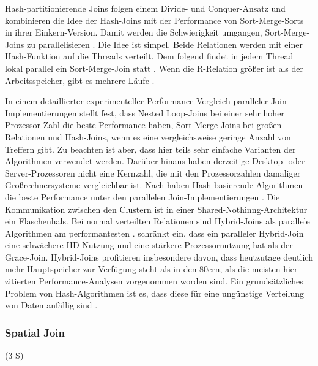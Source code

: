 \documentclass[a4paper,12pt,twoside]{article}
\begin{document}
Hash-partitionierende Joins folgen einem Divide- und Conquer-Ansatz und kombinieren die Idee der Hash-Joins mit der Performance von Sort-Merge-Sorts in ihrer Einkern-Version. Damit werden die Schwierigkeit umgangen, Sort-Merge-Joins zu parallelisieren {\autocite[S. 75ff]{Mishra199}}. Die Idee ist simpel. Beide Relationen werden mit einer Hash-Funktion auf die Threads verteilt. Dem folgend findet in jedem Thread lokal parallel ein Sort-Merge-Join statt {\autocite{Richardson1987}}. Wenn die R-Relation größer ist als der Arbeitsspeicher, gibt es mehrere Läufe {\autocite{Lu1990}}.

In einem detaillierter experimenteller Performance-Vergleich paralleler Join-Implementierungen stellt {\textcite{Valduriez1984}} fest, dass Nested Loop-Joins bei einer sehr hoher Prozessor-Zahl die beste Performance haben, Sort-Merge-Joins bei großen Relationen und Hash-Joins, wenn es eine vergleichsweise geringe Anzahl von Treffern gibt. Zu beachten ist aber, dass hier teils sehr einfache Varianten der Algorithmen verwendet werden. Darüber hinaus haben derzeitige Desktop- oder Server-Prozessoren nicht eine Kernzahl, die mit den Prozessorzahlen damaliger Großrechnersysteme vergleichbar ist. Nach {\textcite{Richardson1987}} haben Hash-basierende Algorithmen die beste Performance unter den parallelen Join-Implementierungen {\autocite[vgl. auch ]{Gerber1986}}. Die Kommunikation zwischen den Clustern ist in einer Shared-Nothinng-Architektur ein Flaschenhals. Bei normal verteilten Relationen sind Hybrid-Joins als parallele Algorithmen am performantesten {\autocite{Schneider1989}}. {\textcite{DeWitt1985}} schränkt ein, dass ein paralleler Hybrid-Join eine schwächere HD-Nutzung und eine stärkere Prozessornutzung hat als der Grace-Join. Hybrid-Joins profitieren insbesondere davon, dass heutzutage deutlich mehr Hauptspeicher zur Verfügung steht als in den 80ern, als die meisten hier zitierten Performance-Analysen vorgenommen worden sind. Ein grundsätzliches Problem von Hash-Algorithmen ist es, dass diese für eine ungünstige Verteilung von Daten anfällig sind {\autocite{Lakshmi1990}}.


\subsubsection{Spatial Join} (3  S)
\label{Spatial Join} 
\end{document}
